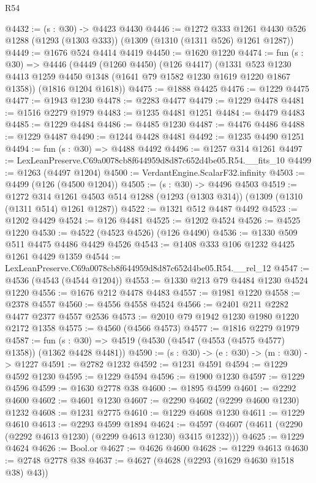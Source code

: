 \begin{lexlean}{R54}
\begin{coremodule}
@4432 := (s : @30) -> @4423 @4430
@4446 := @1272
    @333
    @1261
    @4430
    @526
    @1288
    (@1293 (@1303 @333))
    (@1309 (@1310 (@1311 @526) @1261 @1287))
@4449 := @1676 @524 @4414 @4419
@4450 := @1620 @1220
@4474 := fun (s : @30) =>
  @4446
    (@4449
      (@1260 @4450)
      (@126 @4417)
      (@1331 @523 @1230 @4413 @1259 @4450 @1348 (@1641 @79 @1582 @1230 @1619 @1220 @1867 @1358))
      (@1816 @1204 @1618))
@4475 := @1888 @4425
@4476 := @1229 @4475
@4477 := @1943 @1230
@4478 := @2283 @4477
@4479 := @1229 @4478
@4481 := @1516 @2279 @1979
@4483 := @1235 @4481 @1251
@4484 := @4479 @4483
@4485 := @1229 @4484
@4486 := @4485 @1230
@4487 := @4476 @4486
@4488 := @1229 @4487
@4490 := @1244 @4428 @4481
@4492 := @1235 @4490 @1251
@4494 := fun (s : @30) => @4488 @4492
@4496 := @1257 @314 @1261
@4497 := LexLeanPreserve.C69a0078cb8f644959d8d87c652d4be05.R54.__fits_10
@4499 := @1263 (@4497 @1204)
@4500 := VerdantEngine.ScalarF32.infinity
@4503 := @4499 (@126 (@4500 @1204))
@4505 := (s : @30) -> @4496 @4503
@4519 := @1272
    @314
    @1261
    @4503
    @514
    @1288
    (@1293 (@1303 @314))
    (@1309 (@1310 (@1311 @514) @1261 @1287))
@4522 := @1321 @512 @4487 @4492
@4523 := @1202 @4429
@4524 := @126 @4481
@4525 := @1202 @4524
@4526 := @4525 @1220
@4530 := @4522 (@4523 @4526) (@126 @4490)
@4536 := @1330 @509 @511 @4475 @4486 @4429 @4526
@4543 := @1408 @333 @106 @1232 @4425 @1261 @4429 @1359
@4544 := LexLeanPreserve.C69a0078cb8f644959d8d87c652d4be05.R54.__rel_12
@4547 := @4536 (@4543 (@4544 @1204))
@4553 := @1330 @213 @79 @4484 @1230 @4524 @1220
@4556 := @1676 @212 @4478 @4483
@4557 := @1981 @1220
@4558 := @2378 @4557
@4560 := @4556 @4558 @4524
@4566 := @2401 @211 @2282 @4477 @2377 @4557 @2536
@4573 := @2010 @79 @1942 @1230 @1980 @1220 @2172 @1358
@4575 := @4560 (@4566 @4573)
@4577 := @1816 @2279 @1979
@4587 := fun (s : @30) => @4519 (@4530 (@4547 (@4553 (@4575 @4577) @1358)) (@1362 @4428 @4481))
@4590 := (s : @30) -> (e : @30) -> (m : @30) -> @1227
@4591 := @2782 @1232
@4592 := @1231 @4591
@4594 := @1229 @4592 @1230
@4595 := @1229 @4594
@4596 := @1900 @1230
@4597 := @1229 @4596
@4599 := @1630 @2778 @38
@4600 := @1895 @4599
@4601 := @2292 @4600
@4602 := @4601 @1230
@4607 := @2290 @4602 (@2299 @4600 @1230) @1232
@4608 := @1231 @2775
@4610 := @1229 @4608 @1230
@4611 := @1229 @4610
@4613 := @2293 @4599 @1894
@4624 := @4597 (@4607 (@4611 (@2290 (@2292 @4613 @1230) (@2299 @4613 @1230) @3415 @1232)))
@4625 := @1229 @4624
@4626 := Bool.or
@4627 := @4626 @4600
@4628 := @1229 @4613
@4630 := @2748 @2778 @38
@4637 := @4627 (@4628 (@2293 (@1629 @4630 @1518 @38) @43))

\end{coremodule}
\end{lexlean}
